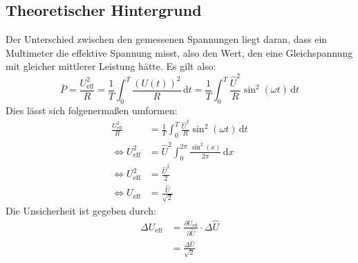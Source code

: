 \documentclass{report}
\begin{document}
\subsection{Theoretischer Hintergrund}
Der Unterschied zwischen den gemessenen Spannungen liegt daran, dass ein Multimeter die effektive Spannung misst, also den Wert, 
den eine Gleichspannung mit gleicher mittlerer Leistung hätte. Es gilt also:
\begin{equation}
    \bar{P} = \frac{U_\mathrm{eff}^2}{R} = \frac{1}{T}\int_{0}^{T} \frac{(U(t))^2}{R} \,\mathrm{d}t = \frac{1}{T}\int_{0}^{T} \frac{\hat{U}^2}{R}\sin^2(\omega t) \,\mathrm{d}t 
\end{equation}
Dies lässt sich folgenermaßen umformen:
\begin{equation}
    \begin{split}
        \frac{U_\mathrm{eff}^2}{R}          &= \frac{1}{T}\int_{0}^{T} \frac{\hat{U}^2}{R}\sin^2(\omega t) \,\mathrm{d}t \\
        \Leftrightarrow U_\mathrm{eff}^2    &= \hat{U}^2 \int_{0}^{2\pi} \frac{\sin^2(x)}{2\pi} \, \mathrm{d}x \\
        \Leftrightarrow U_\mathrm{eff}^2    &= \frac{\hat{U}^2}{2} \\
        \Leftrightarrow U_\mathrm{eff}      &= \frac{\hat{U}}{\sqrt{2}}
    \end{split}
\end{equation}
Die Unsicherheit ist gegeben durch:
\begin{equation}
    \begin{split}
        \Delta U_\mathrm{eff}    &= \frac{\partial U_\mathrm{eff}}{\partial \hat{U}} \cdot \Delta \hat{U} \\
                        &= \frac{\Delta \hat{U}}{\sqrt{2}}
    \end{split}
\end{equation}
\end{document}
